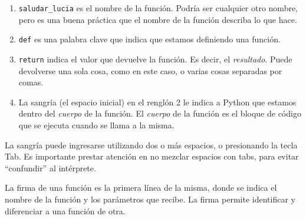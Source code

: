 \documentclass[
  letterpaper,
  DIV=11,
  numbers=noendperiod]{scrreprt}
\providecommand{\tightlist}{%
  \setlength{\itemsep}{0pt}\setlength{\parskip}{0pt}}\usepackage{longtable,booktabs,array}
\begin{document}
\begin{enumerate}
\def\labelenumi{\arabic{enumi}.}
\tightlist
\item
  \texttt{saludar\_lucia} es el nombre de la función. Podría ser
  cualquier otro nombre, pero es una buena práctica que el nombre de la
  función describa lo que hace.\\
\item
  \texttt{def} es una palabra clave que indica que estamos definiendo
  una función.\\
\item
  \texttt{return} indica el valor que devuelve la función. Es decir, el
  \emph{resultado}. Puede devolverse una sola cosa, como en este caso, o
  varias cosas separadas por comas.\\
\item
  La sangría (el espacio inicial) en el renglón 2 le indica a Python que
  estamos dentro del \emph{cuerpo} de la función. El \emph{cuerpo} de la
  función es el bloque de código que se ejecuta cuando se llama a la
  misma.\\
\end{enumerate}

\begin{tcolorbox}[enhanced jigsaw, bottomrule=.15mm, leftrule=.75mm, opacityback=0, colback=white, toprule=.15mm, bottomtitle=1mm, opacitybacktitle=0.6, rightrule=.15mm, left=2mm, arc=.35mm, coltitle=black, title=\textcolor{quarto-callout-note-color}{\faInfo}\hspace{0.5em}{Sangría}, breakable, toptitle=1mm, colframe=quarto-callout-note-color-frame, titlerule=0mm, colbacktitle=quarto-callout-note-color!10!white]

La sangría puede ingresarse utilizando dos o más espacios, o presionando
la tecla Tab. Es importante prestar atención en no mezclar espacios con
tabs, para evitar ``confundir'' al intérprete.

\end{tcolorbox}

\begin{tcolorbox}[enhanced jigsaw, bottomrule=.15mm, leftrule=.75mm, opacityback=0, colback=white, toprule=.15mm, bottomtitle=1mm, opacitybacktitle=0.6, rightrule=.15mm, left=2mm, arc=.35mm, coltitle=black, title=\textcolor{quarto-callout-tip-color}{\faLightbulb}\hspace{0.5em}{Firma de la función}, breakable, toptitle=1mm, colframe=quarto-callout-tip-color-frame, titlerule=0mm, colbacktitle=quarto-callout-tip-color!10!white]

La firma de una función es la primera línea de la misma, donde se indica
el nombre de la función y los parámetros que recibe. La firma permite
identificar y diferenciar a una función de otra.

\end{tcolorbox}
\end{document}
